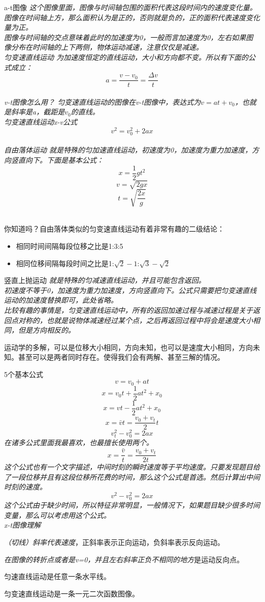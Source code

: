 \documentclass[a4paper, 12pt]{article}
\newcommand{\defitem}[2]{
\noindent \textsf{#1} \hspace{1em} \itshape{#2} \\
}
\newcommand{\noticebox}[1]{
  \begin{arcbox}
    \normalfont #1
  \end{arcbox}
}
\begin{document}
\defitem{a-t图像}{
  这个图像里面，图像与时间轴包围的面积代表这段时间内的速度变化量。\\
  图像在时间轴上方，那么面积认为是正的，否则就是负的，正的面积代表速度变化量为正。\\
  图像与时间轴的交点意味着此时的加速度为0，一般而言加速度为0，左右如果图像分布在时间轴的上下两侧，物体运动减速，注意仅仅是减速。
}
\defitem{匀变速直线运动}{为加速度恒定的直线运动，大小和方向都不变。所以有下面的公式成立：
  \[a=\frac{v-v_0}{t}=\frac{\Delta v}{t}\]
}
\defitem{v-t图像怎么用？}{匀变速直线运动的图像在v-t图像中，表达式为$v=at+v_0$，也就是斜率是a，截距是$v_0$的直线。}
\defitem{匀变速直线运动x-v公式}{
  \[v^2=v_0^2+2ax\]
}
\defitem{自由落体运动}{
  就是特殊的匀加速直线运动，初速度为0，加速度为重力加速度，方向竖直向下。下面是基本公式：
  \[x=\frac12gt^2\]
  \[v=\sqrt{2gx}\]
  \[t=\sqrt{\frac{2x}{g}}\]
}
\noticebox{
  你知道吗？自由落体类似的匀变速直线运动有着非常有趣的二级结论：
  \begin{itemize}
    \item 相同时间间隔每段位移之比是1:3:5
    \item 相同位移间隔每段时间之比是1:$\sqrt2-1$:$\sqrt3-\sqrt2$
  \end{itemize}
}
\defitem{竖直上抛运动}{
  就是特殊的匀减速直线运动，并且可能包含返回。\\
  初速度不等于0，加速度为重力加速度，方向竖直向下。公式只需要把匀变速直线运动的加速度替换即可，此处省略。\\
  比较有趣的事情是，匀变速直线运动中，所有的返回加速过程与减速过程是关于返回点对称的，也就是说物体减速经过某个点，之后再返回过程中将会是速度大小相同，但是方向相反的。
}
\noticebox{
  运动学的多解，可以是位移大小相同，方向未知，也可以是速度大小相同，方向未知。甚至可以是两者同时存在。使得我们会有两解、甚至三解的情况。
}
\defitem{5个基本公式}{
  \[v=v_0+at\]
  \[x=v_0t+\frac12at^2+x_0\]
  \[x=vt-\frac12at^2+x_0\]
  \[x=\bar vt=\frac{v_0+v_t}{2}t\]
  \[v_t^2-v_0^2=2ax\]
  在诸多公式里面我最喜欢，也最擅长使用两个。\[x=\frac{\bar v}{t}=\frac{v_0+v_t}{2t}\]这个公式也有一个文字描述，中间时刻的瞬时速度等于平均速度。只要发现题目给了一段位移并且有这段位移所花费的时间，那么这个公式是首选。然后计算出中间时刻的速度。\[v^2-v_0^2=2ax\]这个公式由于缺少时间，所以特征非常明显，一般情况下，如果题目缺少很多时间变量，那么可以考虑用这个公式。
}
\defitem{x-t图像理解}{
  \emph{（切线）斜率代表速度}，正斜率表示正向运动，负斜率表示反向运动。

  \emph{在图像的转折点或者是v=0，并且左右斜率正负不相同的地方}是运动反向点。

  匀速直线运动是任意一条水平线。

  匀变速直线运动是一条一元二次函数图像。
}
\end{document}

